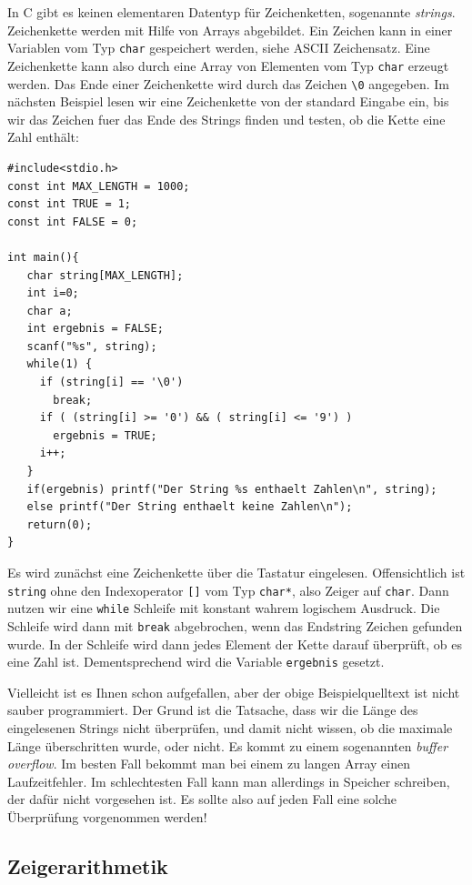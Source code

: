 In C gibt es keinen elementaren Datentyp für Zeichenketten, sogenannte \emph{strings}.
Zeichenkette werden mit Hilfe von Arrays abgebildet.
Ein Zeichen kann in einer Variablen vom Typ \verb|char| gespeichert werden, siehe ASCII Zeichensatz.
Eine Zeichenkette kann also durch eine Array von Elementen vom Typ \verb|char| erzeugt werden.
Das Ende einer Zeichenkette wird durch das Zeichen \verb|\0| angegeben.
Im nächsten Beispiel lesen wir eine Zeichenkette von der standard Eingabe ein, bis wir das Zeichen fuer das Ende des Strings finden und testen, ob die Kette eine Zahl enthält:
\begin{lstlisting}
#include<stdio.h>
const int MAX_LENGTH = 1000;
const int TRUE = 1;
const int FALSE = 0;

int main(){
   char string[MAX_LENGTH];
   int i=0;
   char a;
   int ergebnis = FALSE;
   scanf("%s", string);
   while(1) {
     if (string[i] == '\0')
       break;
     if ( (string[i] >= '0') && ( string[i] <= '9') )
       ergebnis = TRUE;
     i++;
   }
   if(ergebnis) printf("Der String %s enthaelt Zahlen\n", string);
   else printf("Der String enthaelt keine Zahlen\n");
   return(0);
}
\end{lstlisting}
Es wird zunächst eine Zeichenkette über die Tastatur eingelesen.
Offensichtlich ist \verb|string| ohne den Indexoperator \verb|[]| vom Typ \verb|char*|, also Zeiger auf \verb|char|. 
Dann nutzen wir eine \verb|while| Schleife mit konstant wahrem logischem Ausdruck.
Die Schleife wird dann mit \verb|break| abgebrochen, wenn das Endstring Zeichen gefunden wurde.
In der Schleife wird dann jedes Element der Kette darauf überprüft, ob es eine Zahl ist.
Dementsprechend wird die Variable \verb|ergebnis| gesetzt.

Vielleicht ist es Ihnen schon aufgefallen, aber der obige Beispielquelltext ist nicht sauber programmiert.
Der Grund ist die Tatsache, dass wir die Länge des eingelesenen Strings nicht überprüfen, und damit nicht wissen, ob die maximale Länge überschritten wurde, oder nicht.
Es kommt zu einem sogenannten \emph{buffer overflow}.
Im besten Fall bekommt man bei einem zu langen Array einen Laufzeitfehler. 
Im schlechtesten Fall kann man allerdings in Speicher schreiben, der dafür nicht vorgesehen ist.
Es sollte also auf jeden Fall eine solche Überprüfung vorgenommen werden!

\subsection{Zeigerarithmetik}

